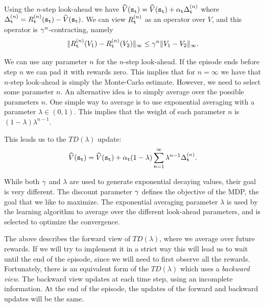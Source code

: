 Using the $n$-step look-ahead we have
$\widehat{V}({\tt s}_{\tt t})=\widehat{V}({\tt s}_{\tt t})+\alpha_{\tt t}
\Delta^{(n)}_{\tt t}$ where
$\Delta^{(n)}_{\tt t}=R^{(n)}_{\tt t}({\tt s}_{\tt t})-\widehat{V}({\tt s}_{\tt t})$.
We can view $R^{(n)}_{\tt t}$ as an operator over $V$, and this operator is
$\gamma^n$-contracting, namely
\[
\| R^{(n)}_{\tt t}(V_1)-R^{(n)}_{\tt t}(V_2)\|_\infty \leq \gamma^n
\|V_1-V_2\|_\infty.
\]

We can use any parameter $n$ for the $n$-step look-ahead. If the
episode ends before step $n$ we can pad it with rewards zero. This
implies that for $n=\infty$ we have that $n$-step look-ahead is
simply the Monte-Carlo estimate. However, we need to select some
parameter $n$. An alternative idea is to simply average over the
possible parameters $n$. One simple way to average is to use
exponential averaging with a parameter $\lambda\in(0,1)$. This
implies that the weight of each parameter $n$ is
$(1-\lambda)\lambda^{n-1}$.

This leads us to the $TD(\lambda)$ update:
\[
\widehat{V}({\tt s}_{\tt t})=\widehat{V}({\tt s}_{\tt t})+\alpha_{\tt t}(1-\lambda)\sum_{n=1}^\infty
\lambda^{n-1}\Delta^{(n)}_{\tt t}.
\]

 While both $\gamma$ and $\lambda$ are used
to generate exponential decaying values, their goal is very
different. The discount parameter $\gamma$ defines the objective
of the MDP, the goal that we like to maximize. The exponential
averaging parameter $\lambda$ is used by the learning algorithm to average over the different
look-ahead parameters, and is selected to optimize the convergence.


The above describes the forward view of $TD(\lambda)$, where we
average over future rewards. If we will try to implement it in a
strict way this will lead us to wait until the end of the episode,
since we will need to first observe all the rewards. Fortunately,
there is an equivalent form of the $TD(\lambda)$ which uses a {\em
backward view}. The backward view updates at each time step, using
an incomplete information. At the end of the episode, the updates of
the forward and backward updates will be the same.

